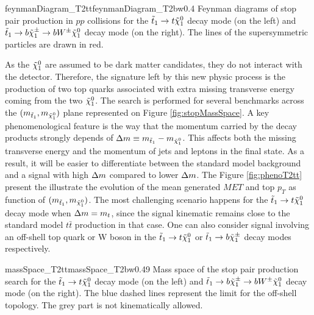                          {feynmanDiagram_T2tt}{feynmanDiagram_T2bw}{0.4}
                         {Feynman diagrams of stop pair production in $pp$ collisions for the 
                         $\tilde{t}_1 \rightarrow t \tilde{\chi}_1^0$ decay mode (on the left) and 
                         $\tilde{t}_1 \rightarrow b \tilde{\chi}_1^\pm \rightarrow b W^{\pm} \tilde{\chi}_1^0$ decay mode 
                         (on the right). The lines of the supersymmetric particles are drawn in red.}
   
        As the $\tilde{\chi}_1^0$ are assumed to be dark matter candidates, they do not interact with the 
        detector. Therefore, the signature left by this new physic process is the production of two top 
        quarks associated with extra missing transverse energy coming from the two $\tilde{\chi}_1^0$. The 
        search is performed for several benchmarks across the $(m_{\tilde{t}_1},m_{\tilde{\chi}_1^0})$ plane 
        represented on Figure \ref{fig:stopMassSpace}. A key phenomenological feature is the way that the 
        momentum carried by the decay products strongly depends of $\Delta m \equiv m_{\tilde{t}_1} - m_{\tilde{\chi}_1^0}$.
        This affects both the missing transverse energy and the momentum of jets and leptons in the final
        state. As a result, it will be easier to differentiate between the standard model background and 
        a signal with high $\Delta m$ compared to lower $\Delta m$. The Figure \ref{fig:phenoT2tt} present
        the illustrate the evolution of the mean generated $MET$ and top $p_T$ as function of $(m_{\tilde{t}_1},
        m_{\tilde{\chi}_1^0})$. The most challenging scenario happens for the $\tilde{t}_1 \rightarrow t \tilde{\chi}_1^0$
        decay mode when $\Delta m = m_{t}$, since the signal kinematic remains close to the standard
        model $t\bar{t}$ production in that case. One can also consider signal involving an off-shell
        top quark or W boson in the $\tilde{t}_1 \rightarrow t \tilde{\chi}_1^0$ or $\tilde{t}_1 \rightarrow b \tilde{\chi}_1^\pm$
        decay modes respectively.

                     {massSpace_T2tt}{massSpace_T2bw}{0.49}
                     {Mass space of the stop pair production search for the $\tilde{t}_1 \rightarrow t \tilde{\chi}_1^0$
                     decay mode (on the left) and $\tilde{t}_1 \rightarrow b \tilde{\chi}_1^\pm \rightarrow b W^{\pm} \tilde{\chi}_1^0 $
                     decay mode (on the right). The blue dashed lines represent the limit for the off-shell topology.
                     The grey part is not kinematically allowed.}
 
